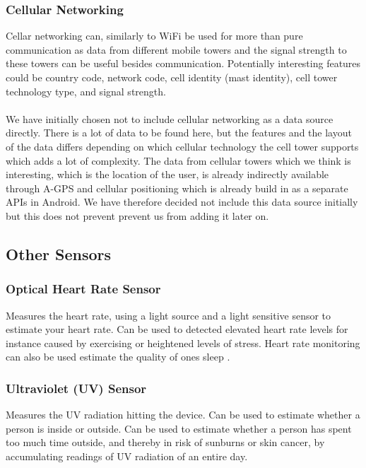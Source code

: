 \subsubsection{Cellular Networking}
Cellar networking can, similarly to WiFi be used for more than pure communication as data from different mobile towers and the signal strength to these towers can be useful besides communication. Potentially interesting features could be country code, network code, cell identity (mast identity), cell tower technology type, and signal strength.
\\\\
We have initially chosen not to include cellular networking as a data source directly. There is a lot of data to be found here, but the features and the layout of the data differs depending on which cellular technology the cell tower supports which adds a lot of complexity. The data from cellular towers which we think is interesting, which is the location of the user, is already indirectly available through A-GPS and cellular positioning which is already build in as a separate APIs in Android. We have therefore decided not include this data source initially but this does not prevent prevent us from adding it later on.  

\subsection{Other Sensors}

\subsubsection{Optical Heart Rate Sensor}
Measures the heart rate, using a light source and a light sensitive sensor to estimate your heart rate. Can be used to detected elevated heart rate levels for instance caused by exercising or heightened levels of stress. Heart rate monitoring can also be used estimate the quality of ones sleep \parencite{guardian_fitness_tracker_rem_sleep}. 

\subsubsection{Ultraviolet (UV) Sensor}
Measures the UV radiation hitting the device. Can be used to estimate whether a person is inside or outside. Can be used to estimate whether a person has spent too much time outside, and thereby in risk of sunburns or skin cancer, by accumulating readings of UV radiation of an entire day.   

